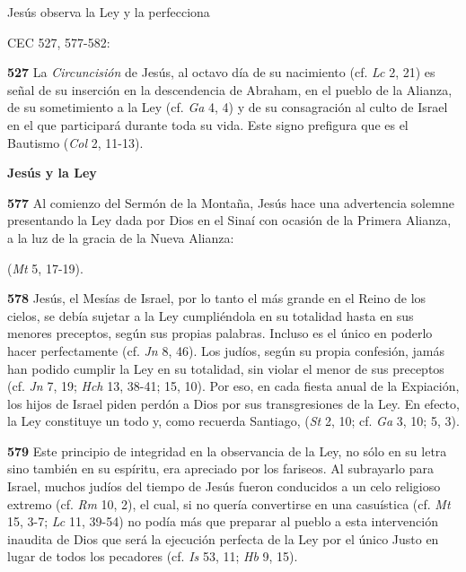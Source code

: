 \begin{body}
\begin{body}
Jesús observa la Ley y la perfecciona

CEC 527, 577-582:

\textbf{527} La \emph{Circuncisión} de Jesús, al octavo día de su nacimiento (cf. \emph{Lc} 2, 21) es señal de su inserción en la descendencia de Abraham, en el pueblo de la Alianza, de su sometimiento a la Ley (cf. \emph{Ga} 4, 4) y de su consagración al culto de Israel en el que participará durante toda su vida. Este signo prefigura  que es el Bautismo (\emph{Col} 2, 11-13).

\textbf{Jesús y la Ley}

\textbf{577} Al comienzo del Sermón de la Montaña, Jesús hace una advertencia solemne presentando la Ley dada por Dios en el Sinaí con ocasión de la Primera Alianza, a la luz de la gracia de la Nueva Alianza:

 (\emph{Mt} 5, 17-19).

\textbf{578} Jesús, el Mesías de Israel, por lo tanto el más grande en el Reino de los cielos, se debía sujetar a la Ley cumpliéndola en su totalidad hasta en sus menores preceptos, según sus propias palabras. Incluso es el único en poderlo hacer perfectamente (cf. \emph{Jn} 8, 46). Los judíos, según su propia confesión, jamás han podido cumplir la Ley en su totalidad, sin violar el menor de sus preceptos (cf. \emph{Jn} 7, 19; \emph{Hch} 13, 38-41; 15, 10). Por eso, en cada fiesta anual de la Expiación, los hijos de Israel piden perdón a Dios por sus transgresiones de la Ley. En efecto, la Ley constituye un todo y, como recuerda Santiago,  (\emph{St} 2, 10; cf. \emph{Ga} 3, 10; 5, 3).

\textbf{579} Este principio de integridad en la observancia de la Ley, no sólo en su letra sino también en su espíritu, era apreciado por los fariseos. Al subrayarlo para Israel, muchos judíos del tiempo de Jesús fueron conducidos a un celo religioso extremo (cf. \emph{Rm} 10, 2), el cual, si no quería convertirse en una casuística  (cf. \emph{Mt} 15, 3-7; \emph{Lc} 11, 39-54) no podía más que preparar al pueblo a esta intervención inaudita de Dios que será la ejecución perfecta de la Ley por el único Justo en lugar de todos los pecadores (cf. \emph{Is} 53, 11; \emph{Hb} 9, 15).


\end{body}
\end{body}
